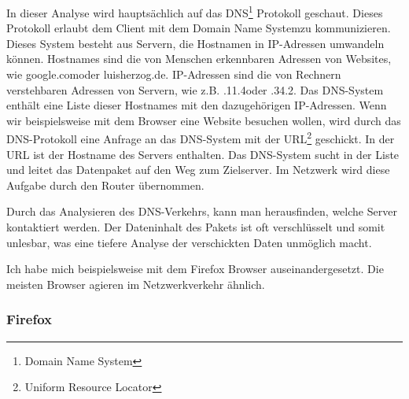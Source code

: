\documentclass[12pt]{article}
\begin{document}
In dieser Analyse wird hauptsächlich auf das DNS\footnote{Domain Name System} Protokoll geschaut. Dieses Protokoll erlaubt dem Client mit dem \glq Domain Name System\grq zu kommunizieren. Dieses System besteht aus Servern, die Hostnamen in IP-Adressen umwandeln können. Hostnames sind die von Menschen erkennbaren Adressen von Websites, wie \glq google.com\grq oder \glq luisherzog.de\grq. IP-Adressen sind die von Rechnern verstehbaren Adressen von Servern, wie z.B. .11.4\grq oder .34.2\grq. Das DNS-System enthält eine Liste dieser Hostnames mit den dazugehörigen IP-Adressen. Wenn wir beispielsweise mit dem Browser eine Website besuchen wollen, wird durch das DNS-Protokoll eine Anfrage an das DNS-System mit der URL\footnote{Uniform Resource Locator} geschickt. In der URL ist der Hostname des Servers enthalten. Das DNS-System sucht in der Liste und leitet das Datenpaket auf den Weg zum Zielserver.\cite{dns-cloudflare} Im Netzwerk wird diese Aufgabe durch den Router übernommen.

Durch das Analysieren des DNS-Verkehrs, kann man herausfinden, welche Server kontaktiert werden. Der Dateninhalt des Pakets ist oft verschlüsselt und somit unlesbar, was eine tiefere Analyse der verschickten Daten unmöglich macht. 

Ich habe mich beispielsweise mit dem Firefox Browser auseinandergesetzt. Die meisten Browser agieren im Netzwerkverkehr ähnlich.

\subsubsection{Firefox}
\end{document}
